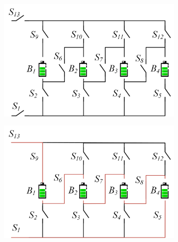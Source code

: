 \documentclass{article}
\providecommand{\DIFaddbeginFL}{} %
\providecommand{\DIFaddendFL}{} %
\providecommand{\DIFdelbeginFL}{} %
\providecommand{\DIFdelendFL}{} %
\newcommand{\DIFscaledelfig}{0.5}
\newlength{\DIFdelgraphicswidth} %
\newlength{\DIFdelgraphicsheight} %
\newcommand{\DIFaddincludegraphics}[2][]{{\color{blue}\fbox{\DIFOincludegraphics[#1]{#2}}}} %
\newcommand{\DIFdelincludegraphics}[2][]{%
\sbox{\DIFdelgraphicsbox}{\DIFOincludegraphics[#1]{#2}}%
\settoboxwidth{\DIFdelgraphicswidth}{\DIFdelgraphicsbox} %
\settoboxtotalheight{\DIFdelgraphicsheight}{\DIFdelgraphicsbox} %
\scalebox{\DIFscaledelfig}{%
\parbox[b]{\DIFdelgraphicswidth}{\usebox{\DIFdelgraphicsbox}\\[-\baselineskip] \rule{\DIFdelgraphicswidth}{0em}}\llap{\resizebox{\DIFdelgraphicswidth}{\DIFdelgraphicsheight}{%
\setlength{\unitlength}{\DIFdelgraphicswidth}%
\begin{picture}(1,1)%
\thicklines\linethickness{2pt} %
{\color[rgb]{1,0,0}\put(0,0){\framebox(1,1){}}}%
{\color[rgb]{1,0,0}\put(0,0){\line( 1,1){1}}}%
{\color[rgb]{1,0,0}\put(0,1){\line(1,-1){1}}}%
\end{picture}%
}\hspace*{3pt}}} %
} %
\DeclareRobustCommand{\DIFaddbeginFL}{\DIFOaddbeginFL \let\includegraphics\DIFaddincludegraphics} %
\DeclareRobustCommand{\DIFaddendFL}{\DIFOaddendFL \let\includegraphics\DIFOincludegraphics} %
\DeclareRobustCommand{\DIFdelbeginFL}{\DIFOdelbeginFL \let\includegraphics\DIFdelincludegraphics} %
\DeclareRobustCommand{\DIFdelendFL}{\DIFOaddendFL \let\includegraphics\DIFOincludegraphics} %
\begin{document}
\begin{figure}[htbp]
    \centering
    \begin{subfigure}[b]{0.45\textwidth}
        \DIFdelbeginFL %
\DIFdelendFL \DIFaddbeginFL \includegraphics[width=\textwidth]{stru-V-origin.png}
        \DIFaddendFL \caption{}
        \label{fig:stru-Visairo}
    \end{subfigure}
    \hspace{0.05\textwidth}
    \begin{subfigure}[b]{0.45\textwidth}
        \DIFdelbeginFL %
\DIFdelendFL \DIFaddbeginFL \includegraphics[width=\textwidth]{stru-V-serial.png}
        \DIFaddendFL \caption{}
        \label{fig:stru-Visairo-serial}
    \end{subfigure}
    \\

\end{figure}
\end{document}
